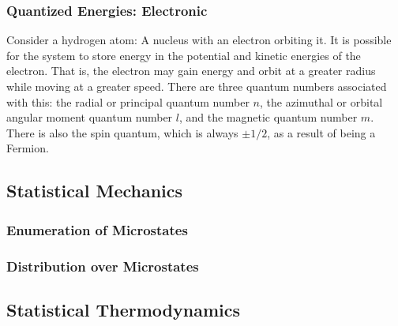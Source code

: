 \documentclass[11pt]{article}
\begin{document}
\subsubsection{Quantized Energies: Electronic}
Consider a hydrogen atom: A nucleus with an electron orbiting it. It is possible for the system to store energy in the potential and kinetic energies of the electron. That is, the electron may gain energy and orbit at a greater radius while moving at a greater speed. There are three quantum numbers associated with this: the radial or principal quantum number $n$, the azimuthal or orbital angular moment quantum number $l$, and the magnetic quantum number $m$. There is also the spin quantum, which is always $\pm1/2$, as a result of being a Fermion.

\subsection{Statistical Mechanics}
\subsubsection{Enumeration of Microstates}
\subsubsection{Distribution over Microstates}

\subsection{Statistical Thermodynamics}
\end{document}
